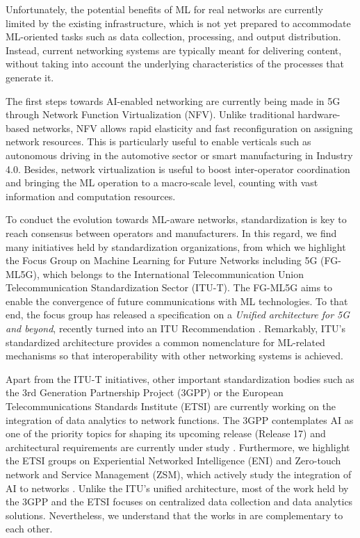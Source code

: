 \documentclass{article}
\begin{document}
Unfortunately, the potential benefits of ML for real networks are currently limited by the existing infrastructure, which is not yet prepared to accommodate ML-oriented tasks such as data collection, processing, and output distribution. Instead, current networking systems are typically meant for delivering content, without taking into account the underlying characteristics of the processes that generate it.

The first steps towards AI-enabled networking are currently being made in 5G through Network Function Virtualization (NFV). Unlike traditional hardware-based networks, NFV allows rapid elasticity and fast reconfiguration on assigning network resources. This is particularly useful to enable verticals such as autonomous driving in the automotive sector or smart manufacturing in Industry 4.0. Besides, network virtualization is useful to boost inter-operator coordination and bringing the ML operation to a macro-scale level, counting with vast information and computation resources. 

To conduct the evolution towards ML-aware networks, standardization is key to reach consensus between operators and manufacturers. In this regard, we find many initiatives held by standardization organizations, from which we highlight the Focus Group on Machine Learning for Future Networks including 5G (FG-ML5G), which belongs to the International Telecommunication Union Telecommunication Standardization Sector (ITU-T). The FG-ML5G aims to enable the convergence of future communications with ML technologies. To that end, the focus group has released a specification on a \emph{Unified architecture for 5G and beyond}, recently turned into an ITU Recommendation \cite{itu2019architecture}. Remarkably, ITU's standardized architecture provides a common nomenclature for ML-related mechanisms so that interoperability with other networking systems is achieved. 

Apart from the ITU-T initiatives, other important standardization bodies such as the 3rd Generation Partnership Project (3GPP) or the European Telecommunications Standards Institute (ETSI) are currently working on the integration of data analytics to network functions. The 3GPP contemplates AI as one of the priority topics for shaping its upcoming release (Release 17) and architectural requirements are currently under study \cite{3gpp2019study}. Furthermore, we highlight the ETSI groups on Experiential Networked Intelligence (ENI) and Zero-touch network and Service Management (ZSM), which actively study the integration of AI to networks \cite{etsi2019architecture}. Unlike the ITU's unified architecture, most of the work held by the 3GPP and the ETSI focuses on centralized data collection and data analytics solutions. Nevertheless, we understand that the works in \cite{itu2019architecture, 3gpp2019study, etsi2019architecture} are complementary to each other.
\end{document}
